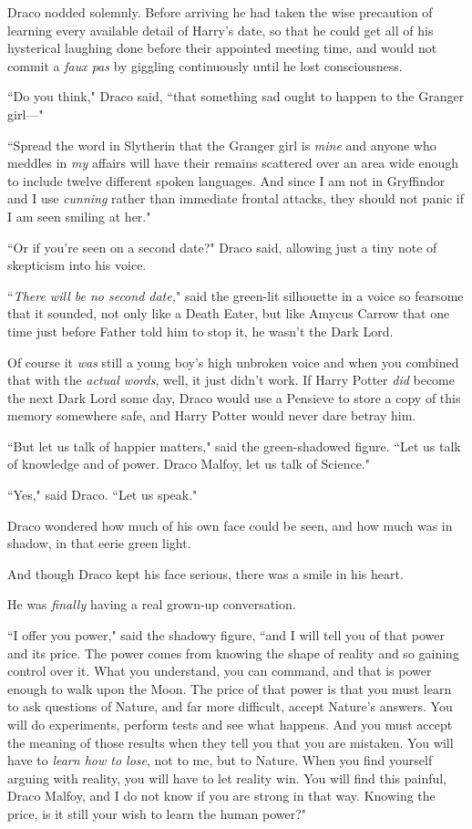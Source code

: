 Draco nodded solemnly. Before arriving he had taken the wise precaution of learning every available detail of Harry's date, so that he could get all of his hysterical laughing done before their appointed meeting time, and would not commit a \emph{faux pas} by giggling continuously until he lost consciousness.

``Do you think," Draco said, ``that something sad ought to happen to the Granger girl---"

``Spread the word in Slytherin that the Granger girl is \emph{mine} and anyone who meddles in \emph{my} affairs will have their remains scattered over an area wide enough to include twelve different spoken languages. And since I am not in Gryffindor and I use \emph{cunning} rather than immediate frontal attacks, they should not panic if I am seen smiling at her."

``Or if you're seen on a second date?" Draco said, allowing just a tiny note of skepticism into his voice.

``\emph{There will be no second date,}" said the green-lit silhouette in a voice so fearsome that it sounded, not only like a Death Eater, but like Amycus Carrow that one time just before Father told him to stop it, he wasn't the Dark Lord.

Of course it \emph{was} still a young boy's high unbroken voice and when you combined that with the \emph{actual words}, well, it just didn't work. If Harry Potter \emph{did} become the next Dark Lord some day, Draco would use a Pensieve to store a copy of this memory somewhere safe, and Harry Potter would never dare betray him.

``But let us talk of happier matters," said the green-shadowed figure. ``Let us talk of knowledge and of power. Draco Malfoy, let us talk of Science."

``Yes," said Draco. ``Let us speak."

Draco wondered how much of his own face could be seen, and how much was in shadow, in that eerie green light.

And though Draco kept his face serious, there was a smile in his heart.

He was \emph{finally} having a real grown-up conversation.

``I offer you power," said the shadowy figure, ``and I will tell you of that power and its price. The power comes from knowing the shape of reality and so gaining control over it. What you understand, you can command, and that is power enough to walk upon the Moon. The price of that power is that you must learn to ask questions of Nature, and far more difficult, accept Nature's answers. You will do experiments, perform tests and see what happens. And you must accept the meaning of those results when they tell you that you are mistaken. You will have to \emph{learn how to lose}, not to me, but to Nature. When you find yourself arguing with reality, you will have to let reality win. You will find this painful, Draco Malfoy, and I do not know if you are strong in that way. Knowing the price, is it still your wish to learn the human power?"

